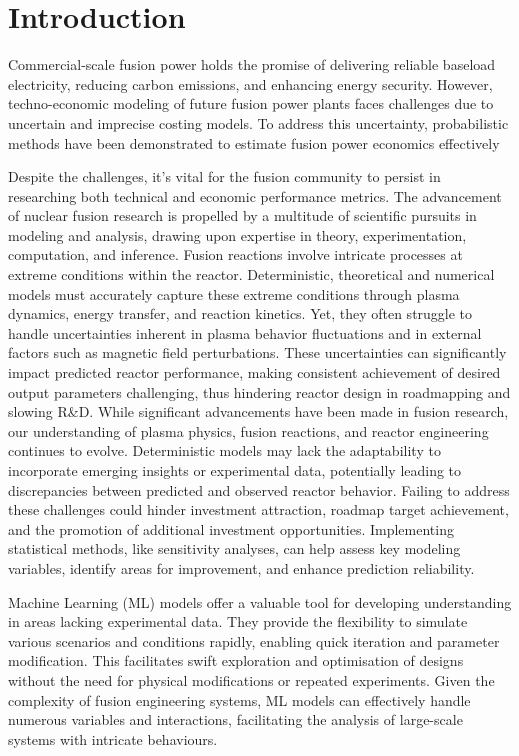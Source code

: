 \documentclass[journal]{IEEEtran}
\begin{document}
\section{Introduction}

Commercial-scale fusion power holds the promise of delivering reliable baseload electricity, reducing carbon emissions, and enhancing energy security. However, techno-economic modeling of future fusion power plants faces challenges due to uncertain and imprecise costing models. To address this uncertainty, probabilistic methods have been demonstrated to estimate fusion power economics effectively~\cite{Griffiths2024}

Despite the challenges, it's vital for the fusion community to persist in researching both technical and economic performance metrics. The advancement of nuclear fusion research is propelled by a multitude of scientific pursuits in modeling and analysis, drawing upon expertise in theory, experimentation, computation, and inference. Fusion reactions involve intricate processes at extreme conditions within the reactor. Deterministic, theoretical and numerical models must accurately capture these extreme conditions through plasma dynamics, energy transfer, and reaction kinetics. Yet, they often struggle to handle uncertainties inherent in plasma behavior fluctuations and in external factors such as magnetic field perturbations. These uncertainties can significantly impact predicted reactor performance, making consistent achievement of desired output parameters challenging, thus hindering reactor design in roadmapping and slowing R\&D. While significant advancements have been made in fusion research, our understanding of plasma physics, fusion reactions, and reactor engineering continues to evolve. Deterministic models may lack the adaptability to incorporate emerging insights or experimental data, potentially leading to discrepancies between predicted and observed reactor behavior. Failing to address these challenges could hinder investment attraction, roadmap target achievement, and the promotion of additional investment opportunities. Implementing statistical methods, like sensitivity analyses, can help assess key modeling variables, identify areas for improvement, and enhance prediction reliability.

Machine Learning (ML) models offer a valuable tool for developing understanding in areas lacking experimental data. They provide the flexibility to simulate various scenarios and conditions rapidly, enabling quick iteration and parameter modification. This facilitates swift exploration and optimisation of designs without the need for physical modifications or repeated experiments. Given the complexity of fusion engineering systems, ML models can effectively handle numerous variables and interactions, facilitating the analysis of large-scale systems with intricate behaviours.
\end{document}
